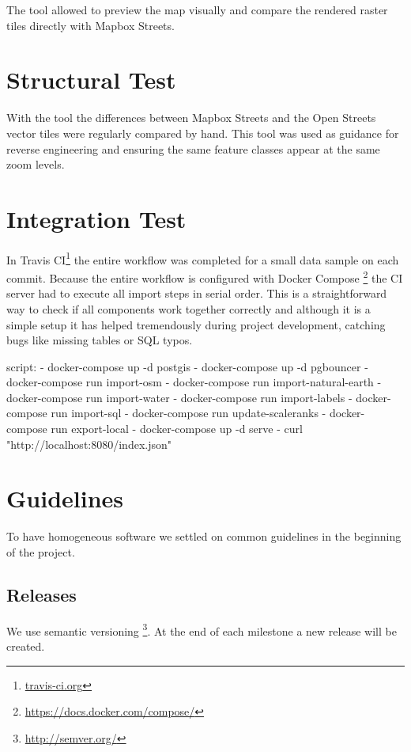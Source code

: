 The  tool allowed to preview the map visually and compare the rendered raster tiles directly with Mapbox Streets.

\section{Structural Test}

With the  tool the differences between Mapbox Streets and the Open Streets vector tiles were regularly compared by hand. This tool was used as guidance for reverse engineering and ensuring the same feature classes appear at the same zoom levels.

\section{Integration Test}

In Travis CI\footnote{\url{travis-ci.org}}  the entire workflow was completed for a small data sample on each commit.
Because the entire workflow is configured with Docker Compose \footnote{\url{https://docs.docker.com/compose/}} the CI server had to execute all import steps in serial order. This is a straightforward way to check if all components work together correctly
and although it is a simple setup it has helped tremendously during project development, catching bugs
like missing tables or SQL typos.

\begin{yamlcode}
script:
  - docker-compose up -d postgis
  - docker-compose up -d pgbouncer
  - docker-compose run import-osm
  - docker-compose run import-natural-earth
  - docker-compose run import-water
  - docker-compose run import-labels
  - docker-compose run import-sql
  - docker-compose run update-scaleranks
  - docker-compose run export-local
  - docker-compose up -d serve
  - curl "http://localhost:8080/index.json"
\end{yamlcode}



\section{Guidelines}\label{guidelines}
To have homogeneous software we settled on common guidelines in the beginning of the project.

\subsection{Releases}
We use semantic versioning \footnote{\url{http://semver.org/}}. At the
end of each milestone a new release will be created.

